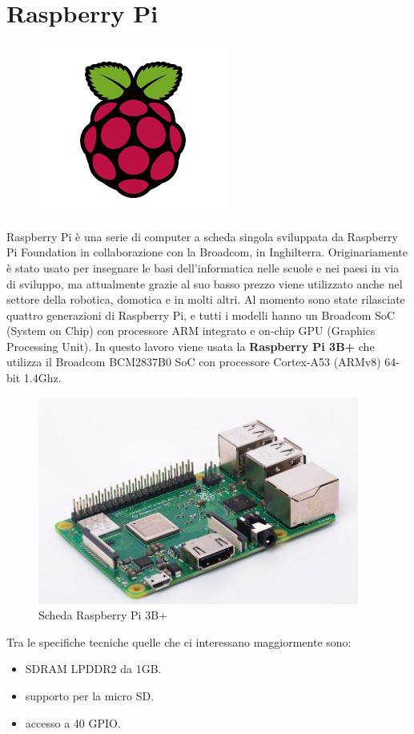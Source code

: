 \documentclass[12pt, a4paper, titlepage, oneside]{book}
\begin{document}
\section{Raspberry Pi}
\begin{figure}[h]
    \centering
    \includegraphics[scale = 0.70]{raspberrypiLogo.png}
\end{figure}
Raspberry Pi è una serie di computer a scheda singola sviluppata da Raspberry Pi Foundation in collaborazione con la Broadcom, in Inghilterra.\newline
Originariamente è stato usato per insegnare le basi dell'informatica nelle scuole e nei paesi in via di sviluppo, ma attualmente grazie al suo basso prezzo viene utilizzato anche nel settore della robotica, domotica e in molti altri.
Al momento sono state rilasciate quattro generazioni di Raspberry Pi, e tutti i modelli hanno un Broadcom SoC (System on Chip) con processore ARM integrato e on-chip GPU (Graphics Processing Unit).\newline
In questo lavoro viene usata la \textbf{Raspberry Pi 3B+} che utilizza il Broadcom BCM2837B0 SoC \cite{bcm2837} con processore Cortex-A53 (ARMv8) 64-bit 1.4Ghz.
\newpage
\begin{figure} [h]
    \centering
    \includegraphics[scale = 1.25]{RPi3B.JPG}
    \caption{Scheda Raspberry Pi 3B+}
    \label{fig:RPI3B_laver}
\end{figure}
Tra le specifiche tecniche quelle che ci interessano maggiormente sono:
\begin{itemize}
    \item SDRAM LPDDR2 da 1GB.
    \item supporto per la micro SD.
    \item accesso a 40 GPIO.
\end{itemize}
\end{document}
